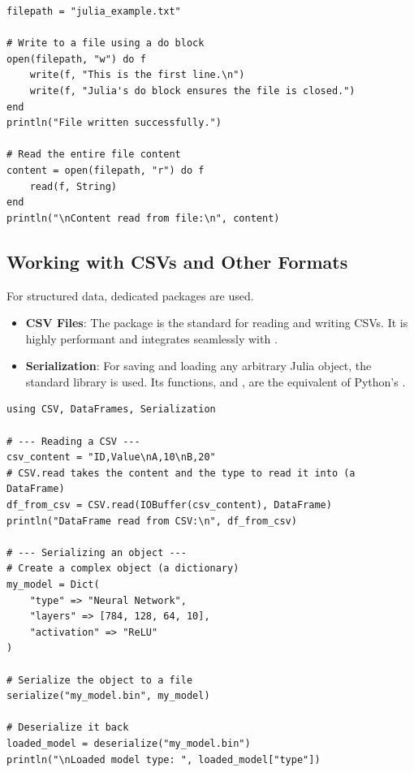 \begin{example}
\text{ }\begin{verbatim}
filepath = "julia_example.txt"

# Write to a file using a do block
open(filepath, "w") do f
    write(f, "This is the first line.\n")
    write(f, "Julia's do block ensures the file is closed.")
end
println("File written successfully.")

# Read the entire file content
content = open(filepath, "r") do f
    read(f, String)
end
println("\nContent read from file:\n", content)
\end{verbatim}
\end{example}

\subsection*{Working with CSVs and Other Formats}
For structured data, dedicated packages are used.
\begin{itemize}
    \item \textbf{CSV Files}: The \textbf{} package is the standard for reading and writing CSVs. It is highly performant and integrates seamlessly with .
    \item \textbf{Serialization}: For saving and loading any arbitrary Julia object, the standard library \textbf{} is used. Its functions,  and , are the equivalent of Python's .
\end{itemize}

\begin{example}
\text{ }\begin{verbatim}
using CSV, DataFrames, Serialization

# --- Reading a CSV ---
csv_content = "ID,Value\nA,10\nB,20"
# CSV.read takes the content and the type to read it into (a DataFrame)
df_from_csv = CSV.read(IOBuffer(csv_content), DataFrame)
println("DataFrame read from CSV:\n", df_from_csv)

# --- Serializing an object ---
# Create a complex object (a dictionary)
my_model = Dict(
    "type" => "Neural Network",
    "layers" => [784, 128, 64, 10],
    "activation" => "ReLU"
)

# Serialize the object to a file
serialize("my_model.bin", my_model)

# Deserialize it back
loaded_model = deserialize("my_model.bin")
println("\nLoaded model type: ", loaded_model["type"])
\end{verbatim}
\end{example}